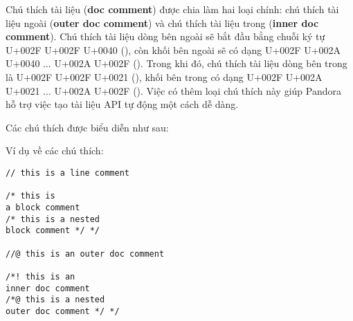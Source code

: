     Chú thích tài liệu (\textbf{doc comment}) được chia làm hai loại chính: chú thích tài liệu ngoài (\textbf{outer doc comment}) và chú thích tài liệu trong (\textbf{inner doc comment}). Chú thích tài liệu dòng bên ngoài sẽ bắt đầu bằng chuỗi ký tự U+002F U+002F U+0040 (), còn khối bên ngoài sẽ có dạng U+002F U+002A U+0040 ... U+002A U+002F (). Trong khi đó, chú thích tài liệu dòng bên trong là U+002F U+002F U+0021 (\kw{//!}), khối bên trong có dạng U+002F U+002A U+0021 ... U+002A U+002F (). Việc có thêm loại chú thích này giúp Pandora hỗ trợ việc tạo tài liệu API tự động một cách dễ dàng.

    Các chú thích được biểu diễn như sau:

    \regexlinecomment

    \regexblockcomment

    \regexdoc

\noindent Ví dụ về các chú thích:
\begin{lstlisting}[]
// this is a line comment

/* this is 
a block comment
/* this is a nested
block comment */ */

//@ this is an outer doc comment

/*! this is an 
inner doc comment 
/*@ this is a nested 
outer doc comment */ */
\end{lstlisting}

